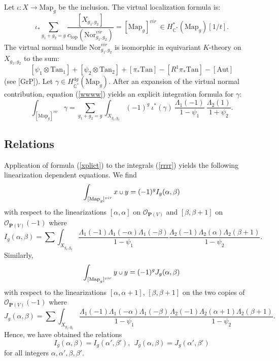\documentclass[11 pt]{amsart}
\newcommand{\proj}{\mathbf P}
\newcommand{\rarr}{\rightarrow}
\newcommand{\oh}{{\mathcal{O}}}
\newcommand{\com}{\mathbb{C}}
\newcommand{\HH}{\Lambda}
\newcommand{\mgp}{\text{Map}_g}
\def\scup{\mathbin{\text{\scriptsize$\cup$}}}
\begin{document}
Let $\iota: X \rarr \mgp$ be the inclusion.
The virtual localization formula is:
\begin{equation}
\label{wwww}
\iota_* \sum_{g_1+g_2=g} \frac{[X_{g_1,g_2}]}
{c_{\text{top}}(\text{Nor}^{vir}_{g_1,g_2})} = [\mgp]^{vir} \ \in 
H^*_{\com^*} (\mgp)[1/t].
\end{equation}
The virtual normal bundle $\text{Nor}^{vir}_{g_1,g_2}$ is 
isomorphic 
in equivariant $K$-theory on $X_{g_1,g_2}$ to the sum:
$$[\psi_1 \otimes \text{Tan}_1] + [\psi_2
\otimes \text{Tan}_2] +
[\pi_*\text{Tan}]-[R^1\pi_*\text{Tan}] -[\text{Aut}]$$
(see [GrP]).
Let $\gamma\in H^{4g}_{\com^*}(\mgp)$. 
After an expansion of the virtual normal
contribution, equation (\ref{wwww})  yields 
an explicit integration formula for $\gamma$:
\begin{equation}
\label{xplict}
\int_{[\mgp]^{vir}} \gamma = \sum_{g_1+g_2=g} \int_{X_{g_1,g_2}}
(-1)^{g} \ \iota^*(\gamma) \ \frac {\HH_1(-1)}
{1-\psi_1}   \ \frac{\HH_2(1)}{1+\psi_2}.
\end{equation}

\subsection{Relations}
Application of formula (\ref{xplict}) to the integrals
(\ref{rrrr}) yields the following linearization dependent
equations.
We find
$$
\int_{[\mgp]^{vir}} x \scup y = (-1)^g I_g(\alpha, \beta)$$
with respect to the linearizations 
$[\alpha, \alpha]$ on $\oh_{\proj(V)}$ and $[\beta, \beta+1]$ on 
$\oh_{\proj(V)}(-1)$
where
\begin{equation}
\label{iiii}
I_g(\alpha, \beta) =
\sum  \int_{X_{g_1,g_2}}
 \frac {\HH_1(-1) \HH_1(-\alpha) \HH_1(-\beta)}
{1-\psi_1}   \frac{\HH_2(-1)\HH_2(\alpha) \HH_2(\beta+1)}{1-\psi_2}.
\end{equation}
Similarly, 
$$
\int_{[\mgp]^{vir}} y \scup y = (-1)^g J_g(\alpha, \beta)$$
with respect to the linearizations $[\alpha, \alpha+1]$,
$[\beta, \beta+1]$ on the two copies of $\oh_{\proj(V)}(-1)$ where
\begin{equation}
\label{jjjj}
J_g(\alpha, \beta) =
\sum \int_{X_{g_1,g_2}}
\frac {\HH_1(-1) \HH_1(-\alpha) \HH_1(-\beta)}
{1-\psi_1}   \frac{\HH_2(-1)\HH_2(\alpha+1)\HH_2(\beta+1)}{1-\psi_2}.
\end{equation}
Hence, we have obtained the relations
\begin{equation}
\label{rell}
I_g(\alpha, \beta)= I_g(\alpha', \beta'), \ \
J_g(\alpha, \beta)= J_g(\alpha', \beta')
\end{equation}
for all integers $\alpha, \alpha', \beta, \beta'$.
\end{document}
